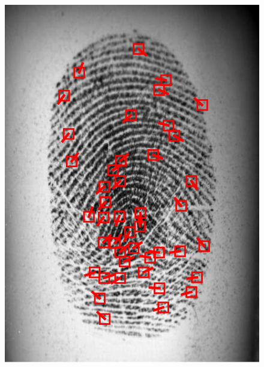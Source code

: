 \def \figwidth {.19}
\begin{figure}[htbp]
    \centering
    \includegraphics[width=\figwidth\linewidth]{fig/minutiaenet/1.jpg}

\end{figure}
